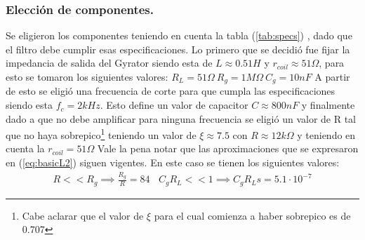 \documentclass[a4paper]{article}
\begin{document}
\subsubsection{Elección de componentes.}
Se eligieron los componentes teniendo en cuenta la tabla (\ref{tab:specs}) , dado que el filtro debe cumplir esas especificaciones.
Lo primero que se decidió fue fijar la impedancia de salida del Gyrator siendo esta de $L \approx 0.51H $ y $r_{coil} \approx 51\Omega $, para esto se tomaron los siguientes valores: $R_L = 51\Omega \ R_g = 1M\Omega \ C_g = 10nF$
A partir de esto se eligió una frecuencia de corte para que cumpla las especificaciones siendo esta  $f_c =2kHz $. Esto define un valor de capacitor $C \approx 800nF$ y finalmente dado a que no debe amplificar para ninguna frecuencia se eligió un valor de R tal que no haya sobrepico\footnote{Cabe aclarar que el valor de $\xi$ para el cual comienza a haber sobrepico es de 0.707} teniendo un valor de $\xi \approx 7.5 $ con $R \approx 12k\Omega $ y teniendo en cuenta la $r_{coil} = 51\Omega$  
Vale la pena notar que las aproximaciones que se expresaron en (\ref{eq:basicL2}) siguen vigentes. En este caso se tienen los siguientes valores:
\begin{align}  R<<R_g \implies  \frac{R_g}{R}=  84 \ \ \ \ C_gR_L << 1 \implies C_gR_Ls =5.1\cdot 10^{-7}\end{align}



\end{document}
